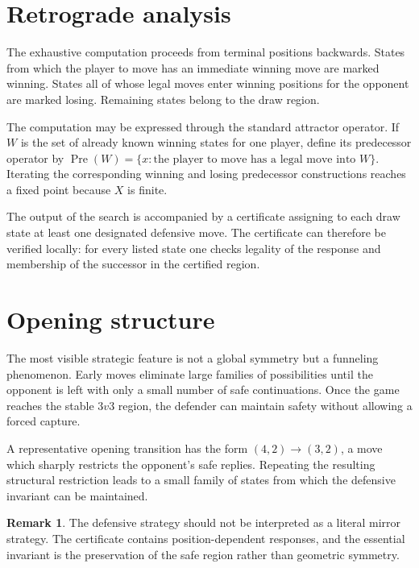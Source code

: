 \documentclass[11pt,a4paper]{article}
\theoremstyle{plain}
\theoremstyle{definition}
\newtheorem{remark}[theorem]{Remark}
\begin{document}
\section{Retrograde analysis}
The exhaustive computation proceeds from terminal positions backwards. States from which the player to move has an immediate winning move are marked winning. States all of whose legal moves enter winning positions for the opponent are marked losing. Remaining states belong to the draw region.

The computation may be expressed through the standard attractor operator. If $W$ is the set of already known winning states for one player, define its predecessor operator by $\operatorname{Pre}(W)=\{x: \text{the player to move has a legal move into }W\}$. Iterating the corresponding winning and losing predecessor constructions reaches a fixed point because $X$ is finite.

The output of the search is accompanied by a certificate assigning to each draw state at least one designated defensive move. The certificate can therefore be verified locally: for every listed state one checks legality of the response and membership of the successor in the certified region.
\section{Opening structure}
The most visible strategic feature is not a global symmetry but a funneling phenomenon. Early moves eliminate large families of possibilities until the opponent is left with only a small number of safe continuations. Once the game reaches the stable $3v3$ region, the defender can maintain safety without allowing a forced capture.

A representative opening transition has the form $(4,2)\longrightarrow(3,2)$, a move which sharply restricts the opponent's safe replies. Repeating the resulting structural restriction leads to a small family of states from which the defensive invariant can be maintained.
\begin{remark}
The defensive strategy should not be interpreted as a literal mirror strategy. The certificate contains position-dependent responses, and the essential invariant is the preservation of the safe region rather than geometric symmetry.
\end{remark}
\end{document}
